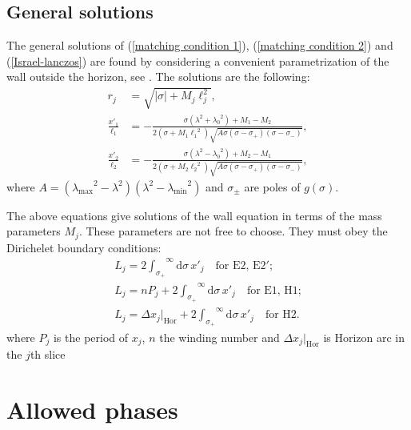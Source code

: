\subsection{General solutions}\label{solutions}

The general solutions of (\ref{matching condition 1}), (\ref{matching condition 2}) and (\ref{Israel-lanczos}) are found by considering a convenient parametrization of the wall outside the horizon, see \cite{Bachas_2021}. The solutions are the following:
\begin{subequations}
\label{wall solution}
\begin{align}
     r_j &= \sqrt{|\sigma| + M_j\ell_j^2},\label{solution r} \\
     \frac{x'_1}{\ell_1} &= -\frac{\sigma\left(\lambda^2+{\lambda_0}^2\right)+M_1-M_2}{2\left(\sigma+M_1{\ell_1}^2\right)\sqrt{A\sigma\left(\sigma-\sigma_+\right)\left(\sigma-\sigma_-\right)}},\label{solution x1} \\
     \frac{x'_2}{\ell_2} &= -\frac{\sigma\left(\lambda^2-{\lambda_0}^2\right)+M_2-M_1}{2\left(\sigma+M_2{\ell_2}^2\right)\sqrt{A\sigma\left(\sigma-\sigma_+\right)\left(\sigma-\sigma_-\right)}}, \label{solution x2}
\end{align}
\end{subequations}
where $A = \left({\lambda_\text{max}}^2-{\lambda}^2\right)\left(\lambda^2-{\lambda_\text{min}}^2\right)$ and $\sigma_\pm$ are poles of $g(\sigma)$.

The above equations give solutions of the wall equation in terms of the mass parameters $M_j$. These parameters are not free to choose. They must obey the Dirichelet boundary conditions:
\begin{gather}\label{Dirichelet bc}
    L_j = 2{\int_{\sigma_+}}^\infty \text{d}\sigma\,x'_j \quad \text{for     E2, E2}'; \\
    L_j = nP_j + 2{\int_{\sigma_+}}^\infty \text{d}\sigma\,x'_j \quad \text{for     E1, H1;} \\
    L_j = \Delta x_j|_\text{Hor} + 2{\int_{\sigma_+}}^\infty \text{d}\sigma\, x'_j \quad \text{for     H2.}\label{Dirichelet hot}
\end{gather}
where $P_j$ is the period of $x_j$, $n$ the winding number and $\Delta x_j|_\text{Hor}$ is Horizon arc in the $j$th slice

\section{Allowed phases}\label{tablesec}

